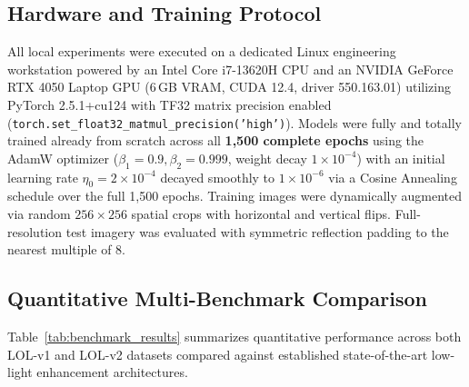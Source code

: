 \documentclass[10pt,twocolumn,letterpaper]{article}
\begin{document}
\subsection{Hardware and Training Protocol}
All local experiments were executed on a dedicated Linux engineering workstation powered by an Intel Core i7-13620H CPU and an NVIDIA GeForce RTX 4050 Laptop GPU (6\,GB VRAM, CUDA 12.4, driver 550.163.01) utilizing PyTorch 2.5.1+cu124 with TF32 matrix precision enabled (\texttt{\small torch.set\_float32\_matmul\_precision('high')}). Models were fully and totally trained already from scratch across all \textbf{1,500 complete epochs} using the AdamW optimizer ($\beta_1 = 0.9, \beta_2 = 0.999$, weight decay $1\times 10^{-4}$) with an initial learning rate $\eta_0 = 2\times 10^{-4}$ decayed smoothly to $1\times 10^{-6}$ via a Cosine Annealing schedule over the full 1,500 epochs. Training images were dynamically augmented via random $256 \times 256$ spatial crops with horizontal and vertical flips. Full-resolution test imagery was evaluated with symmetric reflection padding to the nearest multiple of 8.

\subsection{Quantitative Multi-Benchmark Comparison}
Table~\ref{tab:benchmark_results} summarizes quantitative performance across both LOL-v1 and LOL-v2 datasets compared against established state-of-the-art low-light enhancement architectures.
\end{document}
